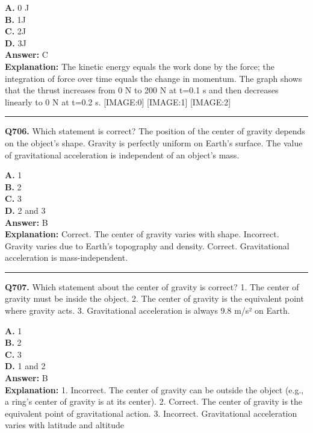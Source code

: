 \documentclass[12pt]{article}
\begin{document}
\textbf{A.} 0 J \\
\textbf{B.} 1J \\
\textbf{C.} 2J \\
\textbf{D.} 3J \\

\textbf{Answer:} C \\
\textbf{Explanation:} The kinetic energy equals the work done by the force; the integration of force over time equals the change in momentum. The graph shows that the thrust increases from 0 N to 200 N at t=0.1 s and then decreases linearly to 0 N at t=0.2 s.
[IMAGE:0]
[IMAGE:1]
[IMAGE:2]

\hrule
\vspace{1em}


\noindent
\textbf{Q706.} Which statement is correct?
The position of the center of gravity depends on the object’s shape.
Gravity is perfectly uniform on Earth’s surface.
The value of gravitational acceleration is independent of an object’s mass.



\textbf{A.} 1 \\
\textbf{B.} 2 \\
\textbf{C.} 3 \\
\textbf{D.} 2 and 3 \\

\textbf{Answer:} B \\
\textbf{Explanation:} Correct. The center of gravity varies with shape.
Incorrect. Gravity varies due to Earth’s topography and density.
Correct. Gravitational acceleration is mass-independent.

\hrule
\vspace{1em}


\noindent
\textbf{Q707.} Which statement about the center of gravity is correct?
1.
The center of gravity must be inside the object.
2.
The center of gravity is the equivalent point where gravity acts.
3.
Gravitational acceleration is always 9.8 m/s² on Earth.



\textbf{A.} 1 \\
\textbf{B.} 2 \\
\textbf{C.} 3 \\
\textbf{D.} 1 and 2 \\

\textbf{Answer:} B \\
\textbf{Explanation:} 1.
Incorrect. The center of gravity can be outside the object (e.g., a ring’s center of gravity is at its center).
2.
Correct. The center of gravity is the equivalent point of gravitational action.
3.
Incorrect. Gravitational acceleration varies with latitude and altitude
\end{document}

